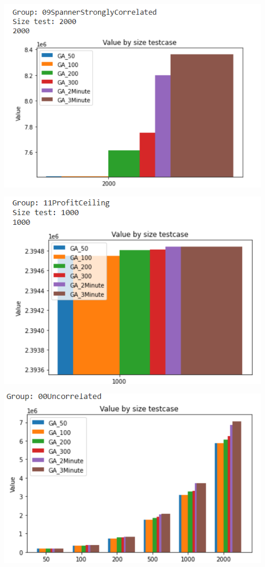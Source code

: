 \documentclass{article}
\begin{document}
\begin{center}
    \centering
    \includegraphics[width=15cm]{image/AI7.png}
\end{center}
\begin{center}
    \centering
    \includegraphics[width=15cm]{image/AI8.png}
\end{center}
\begin{center}
    \centering
    \includegraphics[width=15cm]{image/AI9.png}
\end{center}
\end{document}
